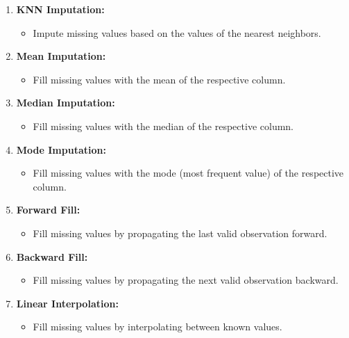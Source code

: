 \documentclass[12pt,letterpaper]{article}
\begin{document}
\begin{enumerate}
    \item \textbf{KNN Imputation:}
    \begin{itemize}
        \item Impute missing values based on the values of the nearest neighbors.

    \end{itemize}

    \item \textbf{Mean Imputation:}
    \begin{itemize}
        \item Fill missing values with the mean of the respective column.

    \end{itemize}

    \item \textbf{Median Imputation:}
    \begin{itemize}
        \item  Fill missing values with the median of the respective column.

    \end{itemize}

    \item \textbf{Mode Imputation:}
    \begin{itemize}
        \item Fill missing values with the mode (most frequent value) of the respective column.

    \end{itemize}

    \item \textbf{Forward Fill:}
    \begin{itemize}
        \item  Fill missing values by propagating the last valid observation forward.

    \end{itemize}

    \item \textbf{Backward Fill:}
    \begin{itemize}
        \item Fill missing values by propagating the next valid observation backward.

    \end{itemize}

    \item \textbf{Linear Interpolation:}
    \begin{itemize}
        \item  Fill missing values by interpolating between known values.


\end{itemize}
\end{enumerate}
\end{document}

